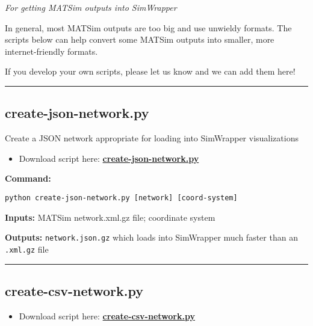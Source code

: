 \emph{For getting MATSim outputs into SimWrapper}

In general, most MATSim outputs are too big and use unwieldy formats.
The scripts below can help convert some MATSim outputs into smaller,
more internet-friendly formats.

If you develop your own scripts, please let us know and we can add them
here!

\begin{center}\rule{0.5\linewidth}{0.5pt}\end{center}

\hypertarget{create-json-network.py}{%
\subsection{create-json-network.py}\label{create-json-network.py}}

Create a JSON network appropriate for loading into SimWrapper
visualizations

\begin{itemize}
\tightlist
\item
  Download script here:
  \textbf{\href{https://raw.githubusercontent.com/simwrapper/simwrapper/master/scripts/create-geojson-network.py}{create-json-network.py}}
\end{itemize}

\textbf{Command:}

\texttt{python\ create-json-network.py\ {[}network{]}\ {[}coord-system{]}}

\textbf{Inputs:} MATSim network.xml.gz file; coordinate system

\textbf{Outputs:} \texttt{network.json.gz} which loads into SimWrapper
much faster than an \texttt{.xml.gz} file

\begin{center}\rule{0.5\linewidth}{0.5pt}\end{center}

\hypertarget{create-csv-network.py}{%
\subsection{create-csv-network.py}\label{create-csv-network.py}}

\begin{itemize}
\tightlist
\item
  Download script here:
  \textbf{\href{https://raw.githubusercontent.com/simwrapper/simwrapper/master/scripts/create-csv-network.py}{create-csv-network.py}}
\end{itemize}

